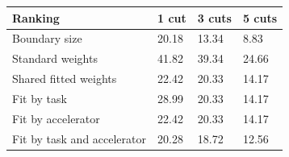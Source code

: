 \begin{tabular}{@{}llll@{}}
\toprule
Ranking & 1 cut & 3 cuts & 5 cuts \\
\midrule
Boundary size & 20.18 & 13.34 & 8.83 \\
Standard weights & 41.82 & 39.34 & 24.66 \\
Shared fitted weights & 22.42 & 20.33 & 14.17 \\
Fit by task & 28.99 & 20.33 & 14.17 \\
Fit by accelerator & 22.42 & 20.33 & 14.17 \\
Fit by task and accelerator & 20.28 & 18.72 & 12.56 \\
\bottomrule
\end{tabular}
